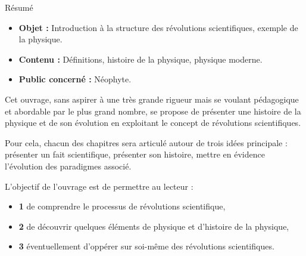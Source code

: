 \begin{center}
\Large
Résumé
\normalsize
\end{center}
\vspace{3cm}
\begin{itemize}[leftmargin=1cm, label=, itemsep=21pt]
\item {\bf Objet : } Introduction à la structure des révolutions scientifiques, exemple de la physique.
\item {\bf Contenu : } Définitions, histoire de la physique, physique moderne.
\item {\bf Public concerné : } Néophyte.
\end{itemize}

\vspace{3cm}

Cet ouvrage, sans aspirer à une très grande rigueur mais se voulant pédagogique et abordable par le plus grand nombre, se propose de présenter une histoire de la physique et de son évolution en exploitant le concept de révolutions scientifiques.

Pour cela, chacun des chapitres sera articulé autour de trois idées principale : présenter un fait scientifique, présenter son histoire, mettre en évidence l'évolution des paradigmes associé.

L'objectif de l'ouvrage est de permettre au lecteur :

\begin{itemize}[leftmargin=1cm, label=, itemsep=2pt]
\item {\bf 1 } de  comprendre le processus de révolutions scientifique,
\item {\bf 2 } de découvrir quelques éléments de physique et d'histoire de la physique,
\item {\bf 3 } éventuellement d'oppérer sur soi-même des révolutions scientifiques.
\end{itemize}


